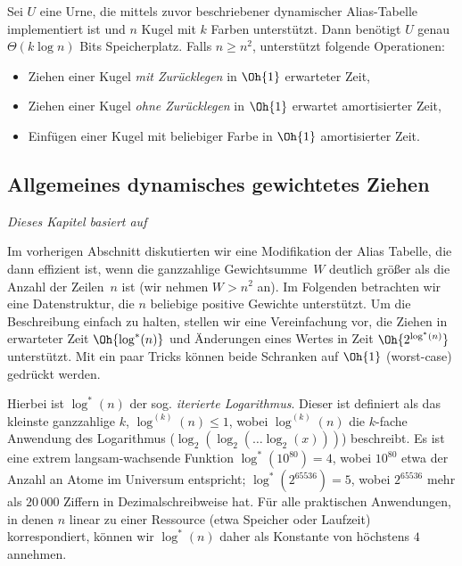 \begin{theorem}
    Sei $U$ eine Urne, die mittels zuvor beschriebener dynamischer Alias-Tabelle implementiert ist und $n$ Kugel mit $k$ Farben unterstützt.
    Dann benötigt $U$ genau $\Theta(k \log n)$ Bits Speicherplatz.
    Falls $n \ge n^2$, unterstützt folgende Operationen:
    \begin{itemize}
        \item Ziehen einer Kugel \emph{mit Zurücklegen} in $\Oh{1}$ erwarteter Zeit,
        \item Ziehen einer Kugel \emph{ohne Zurücklegen} in $\Oh{1}$ erwartet amortisierter Zeit,
        \item Einfügen einer Kugel mit beliebiger Farbe in $\Oh{1}$ amortisierter Zeit.
    \end{itemize}
\end{theorem}

\goodbreak

\subsection{Allgemeines dynamisches gewichtetes Ziehen}
\label{subsec:matias}
\emph{Dieses Kapitel basiert auf \cite{DBLP:journals/mst/MatiasVN03}}

\bigskip
\def\lgs{\ensuremath{\log^*}}

Im vorherigen Abschnitt diskutierten wir eine Modifikation der Alias Tabelle, die dann effizient ist, wenn die ganzzahlige Gewichtsumme~$W$ deutlich größer als die Anzahl der Zeilen~$n$ ist (wir nehmen $W > n^2$ an).
Im Folgenden betrachten wir eine Datenstruktur, die $n$ beliebige positive Gewichte unterstützt.
Um die Beschreibung einfach zu halten, stellen wir eine Vereinfachung vor, die Ziehen in erwarteter Zeit $\Oh{\lgs(n)}$ und Änderungen eines Wertes in Zeit $\Oh{2^{\lgs(n)}}$ unterstützt.
Mit ein paar Tricks können beide Schranken auf $\Oh{1}$ (worst-case) gedrückt werden.

Hierbei  ist $\lgs(n)$ der sog. \emph{iterierte Logarithmus}.
Dieser ist definiert als das kleinste ganzzahlige $k$, \sd $\log^{(k)}(n) \le 1$, wobei $\log^{(k)}(n)$ die $k$-fache Anwendung des Logarithmus ($\log_2(\log_2(\ldots \log_2(x)))$) beschreibt.
Es ist eine extrem langsam-wachsende Funktion $\lgs(10^{80}) = 4$, wobei $10^{80}$ etwa der Anzahl an Atome im Universum entspricht;
$\lgs({2^{65536}})=5$, wobei $2^{65536}$ mehr als $20\,000$ Ziffern in Dezimalschreibweise hat.
Für alle praktischen Anwendungen, in denen $n$ linear zu einer Ressource (etwa Speicher oder Laufzeit) korrespondiert, können wir $\lgs(n)$ daher als Konstante von höchstens $4$ annehmen.

